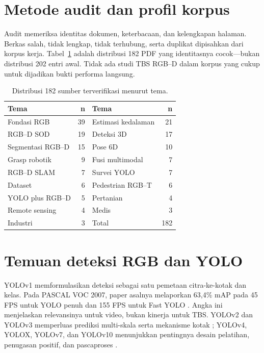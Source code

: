 \section{Metode audit dan profil korpus}

Audit memeriksa identitas dokumen, keterbacaan, dan kelengkapan halaman. Berkas
salah, tidak lengkap, tidak terhubung, serta duplikat dipisahkan dari korpus
kerja. Tabel~\ref{tab:themes} adalah distribusi 182 PDF yang identitasnya
cocok---bukan distribusi 202 entri awal. Tidak ada studi TBS RGB--D dalam
korpus yang cukup untuk dijadikan bukti performa langsung.

\begin{table}[htbp]
\caption{Distribusi 182 sumber terverifikasi menurut tema.}
\label{tab:themes}
\centering\small
\begin{tabular}{lr@{\quad}lr}
\toprule
Tema & n & Tema & n \\
\midrule
Fondasi RGB & 39 & Estimasi kedalaman & 21 \\
RGB--D SOD & 19 & Deteksi 3D & 17 \\
Segmentasi RGB--D & 15 & Pose 6D & 10 \\
Grasp robotik & 9 & Fusi multimodal & 7 \\
RGB--D SLAM & 7 & Survei YOLO & 7 \\
Dataset & 6 & Pedestrian RGB--T & 6 \\
YOLO plus RGB--D & 5 & Pertanian & 4 \\
Remote sensing & 4 & Medis & 3 \\
Industri & 3 & Total & 182 \\
\bottomrule
\end{tabular}
\end{table}

\section{Temuan deteksi RGB dan YOLO}

YOLOv1 memformulasikan deteksi sebagai satu pemetaan citra-ke-kotak dan kelas.
Pada PASCAL VOC 2007, paper asalnya melaporkan 63,4\% mAP pada 45 FPS untuk
YOLO penuh dan 155 FPS untuk Fast YOLO \cite{redmon2016yolo}. Angka ini
menjelaskan relevansinya untuk video, bukan kinerja untuk TBS. YOLOv2 dan
YOLOv3 memperluas prediksi multi-skala serta mekanisme kotak
\cite{redmon2017yolo9000,redmon2018yolov3}; YOLOv4, YOLOX, YOLOv7, dan YOLOv10
menunjukkan pentingnya desain pelatihan, penugasan positif, dan pascaproses
\cite{bochkovskiy2020yolov4,ge2021yolox,wang2023yolov7,wang2024yolov10}.

